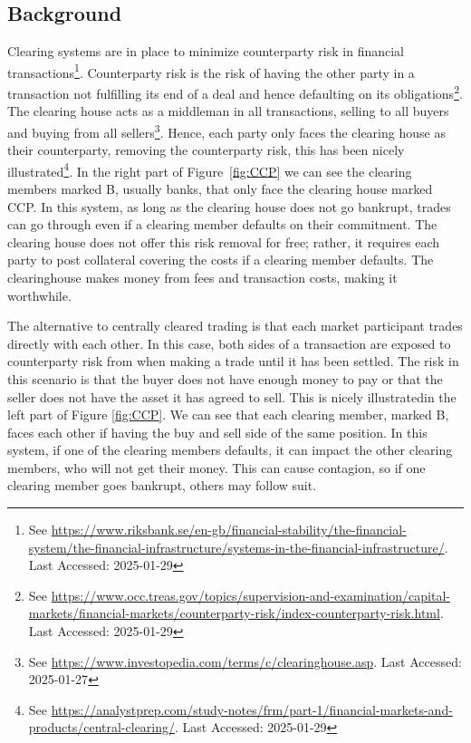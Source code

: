 \subsection{Background}\label{Background}
Clearing systems are in place to minimize counterparty risk in financial transactions\footnote{See \url{https://www.riksbank.se/en-gb/financial-stability/the-financial-system/the-financial-infrastructure/systems-in-the-financial-infrastructure/}. Last Accessed: 2025-01-29}. Counterparty risk is the risk of having the other party in a transaction not fulfilling its end of a deal and hence defaulting on its obligations\footnote{See \url{https://www.occ.treas.gov/topics/supervision-and-examination/capital-markets/financial-markets/counterparty-risk/index-counterparty-risk.html}. Last Accessed: 2025-01-29}. 
The clearing house acts as a middleman in all transactions, selling to all buyers and buying from all sellers\footnote{See \url{https://www.investopedia.com/terms/c/clearinghouse.asp}. Last Accessed: 2025-01-27}. Hence, each party only faces the clearing house as their counterparty, removing the counterparty risk, this has been nicely illustrated\footnote{See \url{https://analystprep.com/study-notes/frm/part-1/financial-markets-and-products/central-clearing/}. Last Accessed: 2025-01-29}. In the right part of Figure~\ref{fig:CCP} we can see the clearing members marked B, usually banks, that only face the clearing house marked CCP. In this system, as long as the clearing house does not go bankrupt, trades can go through even if a clearing member defaults on their commitment. The clearing house does not offer this risk removal for free; rather, it requires each party to post collateral covering the costs if a clearing member defaults. The clearinghouse makes money from fees and transaction costs, making it worthwhile.

The alternative to centrally cleared trading is that each market participant trades directly with each other. In this case, both sides of a transaction are exposed to counterparty risk from when making a trade until it has been settled. The risk in this scenario is that the buyer does not have enough money to pay or that the seller does not have the asset it has agreed to sell. This is nicely illustrated\footnotemark[\value{footnote}] in the left part of Figure \ref{fig:CCP}. We can see that each clearing member, marked B, faces each other if having the buy and sell side of the same position. In this system, if one of the clearing members defaults, it can impact the other clearing members, who will not get their money. This can cause contagion, so if one clearing member goes bankrupt, others may follow suit. 

